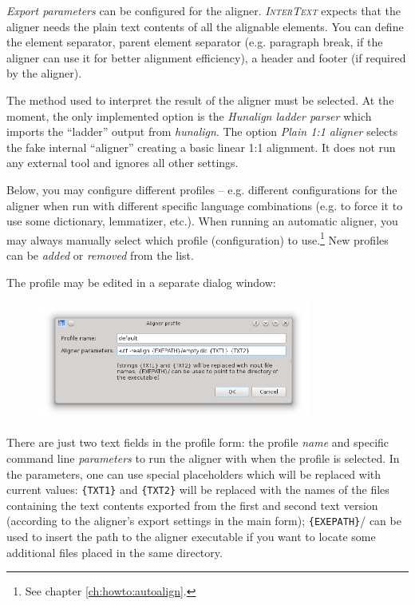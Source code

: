 \documentclass[a4paper,10pt,oneside]{book}
\newcommand{\IT}{\textit{\textsc{InterText}}\xspace}
\begin{document}
\emph{Export parameters} can be configured for the aligner. \IT expects that the aligner needs the plain text contents of all the alignable elements. You can define the element separator, parent element separator (e.g. paragraph break, if the aligner can use it for better alignment efficiency), a header and footer (if required by the aligner).

The method used to interpret the result of the aligner must be selected. At the moment, the only implemented option is the \emph{Hunalign ladder parser} which imports the ``ladder'' output from \emph{hunalign}. The option \emph{Plain 1:1 aligner} selects the fake internal ``aligner'' creating a basic linear 1:1 alignment. It does not run any external tool and ignores all other settings.

Below, you may configure different profiles -- e.g. different configurations for the aligner when run with different specific language combinations (e.g. to force it to use some dictionary, lemmatizer, etc.). When running an automatic aligner, you may always manually select which profile (configuration) to use.\footnote{See chapter \ref{ch:howto:autoalign}.} New profiles can be \emph{added} or \emph{removed} from the list.

The profile may be edited in a separate dialog window:

\begin{figure}[htb]
 \includegraphics[width=0.8\textwidth]{screenshots/settings_aligner_profile.png}
\end{figure}

There are just two text fields in the profile form: the profile \emph{name} and specific command line \emph{parameters} to run the aligner with when the profile is selected. In the parameters, one can use special placeholders which will be replaced with current values: \texttt{\{TXT1\}} and \texttt{\{TXT2\}} will be replaced with the names of the files containing the text contents exported from the first and second text version (according to the aligner's export settings in the main form); \texttt{\{EXEPATH\}}/ can be used to insert the path to the aligner executable if you want to locate some additional files placed in the same directory.
\end{document}
